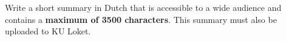 
Write a short summary in Dutch that is accessible to a wide audience and contains a \textbf{maximum of 3500 characters}. This summary must also be uploaded to KU Loket.
